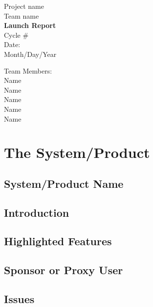 \documentclass{report}
\begin{document}
\begin{titlepage}
    \begin{center}
        \begin{huge}
        Project name \\[1cm]
        Team name \\[2.2cm]
        { \bfseries Launch Report } \\[1cm]
        Cycle \# \\[2.2cm]
        Date: \\[1cm]
        Month/Day/Year
        \end{huge}
    \end{center}
    \null \vfill
    \begin{large}
        Team Members: \\[0.5cm]
        Name \\[0.5cm]
        Name \\[0.5cm]
        Name \\[0.5cm]
        Name \\[0.5cm]
        Name
    \end{large}
\end{titlepage}

\section*{The System/Product}

\subsection*{System/Product Name}

\subsection*{Introduction}

\subsection*{Highlighted Features}

\subsection*{Sponsor or Proxy User}

\subsection*{Issues}
\end{document}
